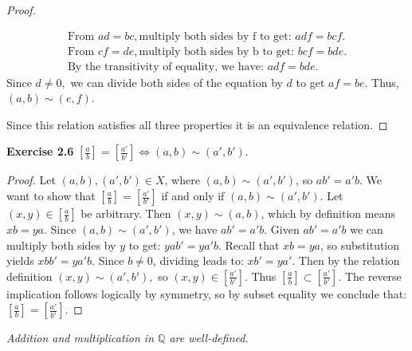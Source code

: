 \documentclass[11pt]{article}
\begin{document}
\begin{enumerate}[label=(\alph*)]
\begin{proof}
\begin{itemize}
                \begin{align*}
                \text{From } ad = bc, \text{multiply both sides by f to get: } adf = bcf. \\
                \text{From } cf = de, \text{multiply both sides by b to get: } bcf = bde. \\ 
                \text{By the transitivity of equality, we have: } adf = bde. 
                \end{align*}
            Since $d \neq 0,$ we can divide both sides of the equation by $d$ to get $af = be.$ Thus, $(a,b) \sim (e,f).$
        \end{itemize} 
        Since this relation satisfies all three properties it is an equivalence relation.
    \end{proof}
\end{enumerate}
\textbf{Exercise 2.6} $\displaystyle \left[\frac{a}{b}\right]=\displaystyle \left[\frac{a'}{b'}\right]\Longleftrightarrow (a,b)\sim (a',b').$
\begin{proof}
Let $(a,b), (a',b') \in X$, where $(a,b) \sim (a',b')$, so $ab' = a'b$. 
We want to show that $\displaystyle \left[\frac{a}{b}\right] = \left[\frac{a'}{b'}\right]$ if and only if $(a,b) \sim (a',b')$.
Let $(x,y) \in \displaystyle \left[\frac{a}{b}\right]$ be arbitrary. 
Then $(x,y) \sim (a,b)$, which by definition means $xb = ya$.
Since $(a,b) \sim (a',b')$, we have $ab' = a'b$. 
Given $ab' = a'b$ we can multiply both sides by $y$ to get: $yab' =ya'b$. Recall that $xb = ya$, so substitution yields $xbb' = ya'b$. Since $b \neq 0$, dividing leads to: $xb' = ya'$.
Then by the relation definition $(x,y) \sim (a', b'),$ so $(x, y) \in \displaystyle \left[\frac{a'}{b'}\right]$. Thus $\displaystyle \left[\frac{a}{b}\right] \subset \left[\frac{a'}{b'}\right].$ The reverse implication follows logically by symmetry, so by subset equality we conclude that:
$\displaystyle \left[\frac{a}{b}\right] = \left[\frac{a'}{b'}\right]$.
\end{proof}
\begin{theorem}[2.8]
\textit{Addition and multiplication in $\mathbb{Q}$ are well-defined}.
\end{theorem}
\end{document}
